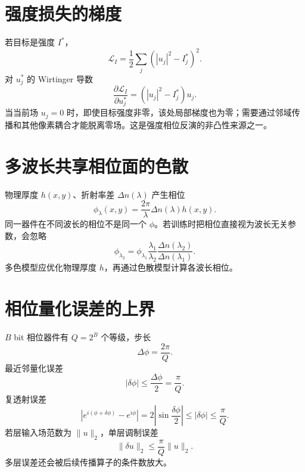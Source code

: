 \documentclass[UTF8,12pt,a4paper,fontset=none]{ctexart}
\numberwithin{equation}{section}
\newcommand{\Loss}{\mathcal{L}}
\begin{document}
\section{强度损失的梯度}
若目标是强度 $I^*$，
\begin{equation}
 \Loss_I=\frac12\sum_j(|u_j|^2-I_j^*)^2.
\end{equation}
对 $u_j^*$ 的 Wirtinger 导数
\begin{equation}
 \frac{\partial\Loss_I}{\partial u_j^*}
 =( |u_j|^2-I_j^*)u_j.
\end{equation}
当当前场 $u_j=0$ 时，即使目标强度非零，该处局部梯度也为零；需要通过邻域传播和其他像素耦合才能脱离零场。这是强度相位反演的非凸性来源之一。

\section{多波长共享相位面的色散}
物理厚度 $h(x,y)$、折射率差 $\Delta n(\lambda)$ 产生相位
\begin{equation}
 \phi_\lambda(x,y)=
 \frac{2\pi}{\lambda}\Delta n(\lambda)h(x,y).
\end{equation}
同一器件在不同波长的相位不是同一个 $\phi$。若训练时把相位直接视为波长无关参数，会忽略
\begin{equation}
 \phi_{\lambda_2}
 =\phi_{\lambda_1}
 \frac{\lambda_1}{\lambda_2}
 \frac{\Delta n(\lambda_2)}{\Delta n(\lambda_1)}.
\end{equation}
多色模型应优化物理厚度 $h$，再通过色散模型计算各波长相位。

\section{相位量化误差的上界}
$B$ bit 相位器件有 $Q=2^B$ 个等级，步长
\begin{equation}
 \Delta\phi=\frac{2\pi}{Q}.
\end{equation}
最近邻量化误差
\begin{equation}
 |\delta\phi|\le\frac{\Delta\phi}{2}=\frac\pi Q.
\end{equation}
复透射误差
\begin{equation}
 |e^{i(\phi+\delta\phi)}-e^{i\phi}|
 =2\left|\sin\frac{\delta\phi}{2}\right|
 \le|\delta\phi|\le\frac\pi Q.
\end{equation}
若层输入场范数为 $\|u\|_2$，单层调制误差
\begin{equation}
 \|\delta u\|_2\le\frac\pi Q\|u\|_2.
\end{equation}
多层误差还会被后续传播算子的条件数放大。
\end{document}
